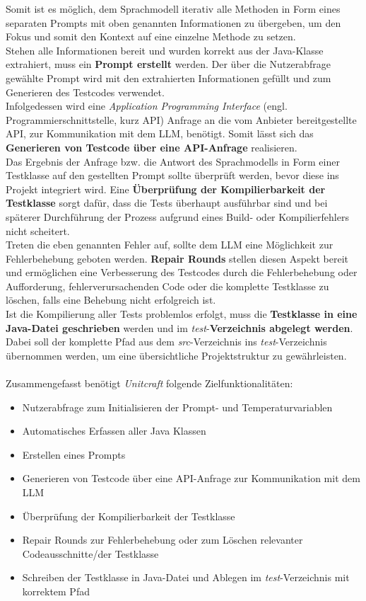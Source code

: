 Somit ist es möglich, dem Sprachmodell iterativ alle Methoden in Form eines separaten Prompts mit oben genannten Informationen zu übergeben, um den Fokus und somit den Kontext auf eine einzelne Methode zu setzen. \\ Stehen alle Informationen bereit und wurden korrekt aus der Java-Klasse extrahiert, muss ein \textbf{Prompt erstellt} werden. Der über die Nutzerabfrage gewählte Prompt wird mit den extrahierten Informationen gefüllt und zum Generieren des Testcodes verwendet.\\ Infolgedessen wird eine \textit{Application Programming Interface} (engl. Programmierschnittstelle, kurz API) Anfrage an die vom Anbieter bereitgestellte \acs{API}, zur Kommunikation mit dem LLM, benötigt. Somit lässt sich das \textbf{Generieren von Testcode über eine API-Anfrage} realisieren.\\ Das Ergebnis der Anfrage bzw. die Antwort des Sprachmodells in Form einer Testklasse auf den gestellten Prompt sollte überprüft werden, bevor diese ins Projekt integriert wird. Eine \textbf{Überprüfung der Kompilierbarkeit der Testklasse} sorgt dafür, dass die Tests überhaupt ausführbar sind und bei späterer Durchführung der Prozess aufgrund eines Build- oder Kompilierfehlers nicht scheitert.\\ Treten die eben genannten Fehler auf, sollte dem LLM eine Möglichkeit zur Fehlerbehebung geboten werden. \textbf{Repair Rounds} stellen diesen Aspekt bereit und ermöglichen eine Verbesserung des Testcodes durch die Fehlerbehebung oder Aufforderung, fehlerverursachenden Code oder die komplette Testklasse zu löschen, falls eine Behebung nicht erfolgreich ist. \\ Ist die Kompilierung aller Tests problemlos erfolgt, muss die \textbf{Testklasse in eine Java-Datei geschrieben} werden und im \textit{test}-\textbf{Verzeichnis abgelegt werden}. Dabei soll der komplette Pfad aus dem \textit{src}-Verzeichnis ins \textit{test}-Verzeichnis übernommen werden, um eine übersichtliche Projektstruktur zu gewährleisten.\\\\Zusammengefasst benötigt \textit{Unitcraft} folgende Zielfunktionalitäten:
\begin{itemize}
    \setlength{\parskip}{1pt}
    \item Nutzerabfrage zum Initialisieren der Prompt- und Temperaturvariablen
    \item Automatisches Erfassen aller Java Klassen
    \item Erstellen eines Prompts
    \item Generieren von Testcode über eine API-Anfrage zur Kommunikation mit dem LLM
    \item Überprüfung der Kompilierbarkeit der Testklasse
    \item Repair Rounds zur Fehlerbehebung oder zum Löschen relevanter Codeausschnitte/der Testklasse
    \item Schreiben der Testklasse in Java-Datei und Ablegen im \textit{test}-Verzeichnis mit korrektem Pfad
\end{itemize}
